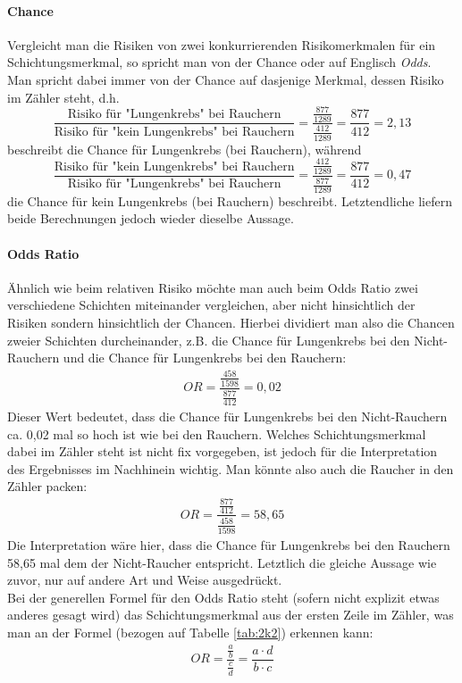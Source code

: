 \documentclass[a4paper]{article}
\newcommand\dangersign[1][2ex]{%
  \renewcommand\stacktype{L}%
  \scaleto{\stackon[1.3pt]{\color{red}$\triangle$}{\tiny !}}{#1}%
}
\begin{document}
\paragraph{Chance} Vergleicht man die Risiken von zwei konkurrierenden Risikomerkmalen für ein Schichtungsmerkmal, so spricht man von der Chance oder auf Englisch \textit{Odds}. Man spricht dabei immer von der Chance auf dasjenige Merkmal, dessen Risiko im Zähler steht, d.h. $$\frac{\mbox{Risiko für "Lungenkrebs" bei Rauchern}}{\mbox{Risiko für "kein Lungenkrebs" bei Rauchern}} = \dfrac{\frac{877}{1289}}{\frac{412}{1289}} = \dfrac{877}{412} = 2,13$$
beschreibt die Chance für Lungenkrebs (bei Rauchern), während
$$\frac{\mbox{Risiko für "kein Lungenkrebs" bei Rauchern}}{\mbox{Risiko für "Lungenkrebs" bei Rauchern}} = \dfrac{\frac{412}{1289}}{\frac{877}{1289}} = \dfrac{877}{412} = 0,47$$
die Chance für kein Lungenkrebs (bei Rauchern) beschreibt. Letztendliche liefern beide Berechnungen jedoch wieder dieselbe Aussage.

\paragraph{Odds Ratio} Ähnlich wie beim relativen Risiko möchte man auch beim Odds Ratio zwei verschiedene Schichten miteinander vergleichen, aber nicht hinsichtlich der Risiken sondern hinsichtlich der Chancen. Hierbei dividiert man also die Chancen zweier Schichten durcheinander, z.B. die Chance für Lungenkrebs bei den Nicht-Rauchern und die Chance für Lungenkrebs bei den Rauchern:
\begin{align*}
    OR = \dfrac{\frac{458}{1598}}{\frac{877}{412}} = 0,02
\end{align*}
Dieser Wert bedeutet, dass die Chance für Lungenkrebs bei den Nicht-Rauchern ca. 0,02 mal so hoch ist wie bei den Rauchern. Welches Schichtungsmerkmal dabei im Zähler steht ist nicht fix vorgegeben, ist jedoch für die Interpretation des Ergebnisses im Nachhinein wichtig. Man könnte also auch die Raucher in den Zähler packen: 
\begin{align*}
    OR = \dfrac{\frac{877}{412}}{\frac{458}{1598}} = 58,65
\end{align*}
Die Interpretation wäre hier, dass die Chance für Lungenkrebs bei den Rauchern 58,65 mal dem der Nicht-Raucher entspricht. Letztlich die gleiche Aussage wie zuvor, nur auf andere Art und Weise ausgedrückt.\\

\noindent \dangersign[3ex] Bei der generellen Formel für den Odds Ratio steht (sofern nicht explizit etwas anderes gesagt wird) das Schichtungsmerkmal aus der ersten Zeile im Zähler, was man an der Formel (bezogen auf Tabelle \ref{tab:2k2}) erkennen kann:
\begin{align*}
    OR = \dfrac{\frac{a}{b}}{\frac{c}{d}} = \dfrac{a \cdot d}{b \cdot c}
\end{align*}\\
\end{document}
